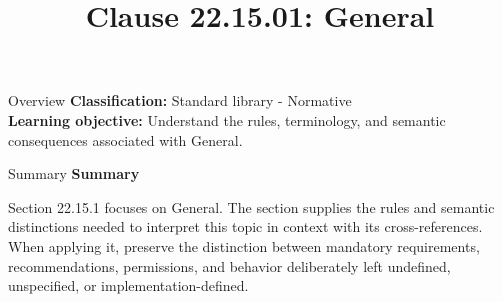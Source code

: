 \documentclass[10pt,letterpaper]{article}
\title{Clause 22.15.01: General}
\author{}
\date{}
\begin{document}
\maketitle
\begin{CornellOverviewBox}{Overview}
\textbf{Classification:} Standard library - Normative\\[2pt]
\textbf{Learning objective:} Understand the rules, terminology, and semantic consequences associated with General.
\end{CornellOverviewBox}\begin{CornellSummaryBox}{Summary}
{\sffamily\bfseries\color{Accent} Summary}\par\vspace{3pt}Section 22.15.1 focuses on General. The section supplies the rules and semantic distinctions needed to interpret this topic in context with its cross-references. When applying it, preserve the distinction between mandatory requirements, recommendations, permissions, and behavior deliberately left undefined, unspecified, or implementation-defined.
\end{CornellSummaryBox}
\end{document}
